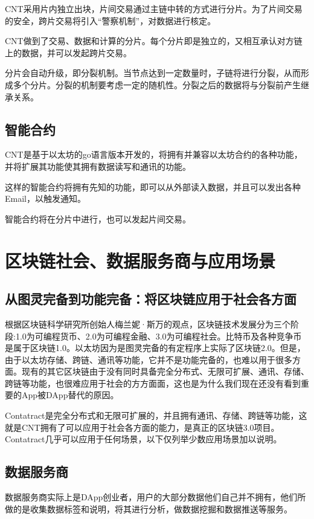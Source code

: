 \documentclass[a4paper,12pt]{article}
\begin{document}
CNT采用片内独立出块，片间交易通过主链中转的方式进行分片。为了片间交易的安全，跨片交易将引入“警察机制”，对数据进行核定。

CNT做到了交易、数据和计算的分片。每个分片即是独立的，又相互承认对方链上的数据，并可以发起跨片交易。

分片会自动升级，即分裂机制。当节点达到一定数量时，子链将进行分裂，从而形成多个分片。分裂的机制要考虑一定的随机性。分裂之后的数据将与分裂前产生继承关系。

\subsection{智能合约}

CNT是基于以太坊的go语言版本开发的，将拥有并兼容以太坊合约的各种功能，并将扩展其功能使其拥有数据读写和通讯的功能。

这样的智能合约将拥有先知的功能，即可以从外部读入数据，并且可以发出各种Email，以触发通知。

智能合约将在分片中进行，也可以发起片间交易。


\section{区块链社会、数据服务商与应用场景}

\subsection{从图灵完备到功能完备：将区块链应用于社会各方面}
根据区块链科学研究所创始人梅兰妮·斯万的观点，区块链技术发展分为三个阶段:1.0为可编程货币、2.0为可编程金融、3.0为可编程社会。比特币及各种竞争币是属于区块链1.0。以太坊因为是图灵完备的有定程序上实际了区块链2.0。但是，由于以太坊存储、跨链、通讯等功能，它并不是功能完备的，也难以用于很多方面。现有的其它区块链由于没有同时具备完全分布式、无限可扩展、通讯、存储、跨链等功能，也很难应用于社会的方方面面，这也是为什么我们现在还没有看到重要的App被DApp替代的原因。

Contatract是完全分布式和无限可扩展的，并且拥有通讯、存储、跨链等功能，这就是CNT拥有了可以应用于社会各方面的能力，是真正的区块链3.0项目。Contatract几乎可以应用于任何场景，以下仅列举少数应用场景加以说明。

\subsection{数据服务商}

数据服务商实际上是DApp创业者，用户的大部分数据他们自己并不拥有，他们所做的是收集数据标签和说明，将其进行分析，做数据挖掘和数据推送等服务。
  
\end{document}
